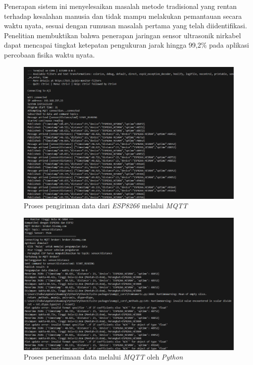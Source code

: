 Penerapan sistem ini menyelesaikan masalah metode tradisional yang rentan terhadap kesalahan manusia dan tidak mampu melakukan pemantauan secara waktu nyata, sesuai dengan rumusan masalah pertama yang telah diidentifikasi. Penelitian \citep{wireless2019ultrasonic} membuktikan bahwa penerapan jaringan sensor ultrasonik nirkabel dapat mencapai tingkat ketepatan pengukuran jarak hingga 99,2\% pada aplikasi percobaan fisika waktu nyata.

\begin{figure}[!htbp]
\centering
    \includegraphics[width=\linewidth]{images/ESP8266-SerialMonitor-MQTT.png}
    \caption{Proses pengiriman data dari \textit{ESP8266} melalui \textit{MQTT}}
    \label{fig:pembahasan-3}
\end{figure}

\begin{figure}[!htbp]
\centering
    \includegraphics[width=\linewidth]{images/Python-MQTT.png}
    \caption{Proses penerimaan data melalui \textit{MQTT} oleh \textit{Python}}
    \label{fig:pembahasan-4}
\end{figure}

